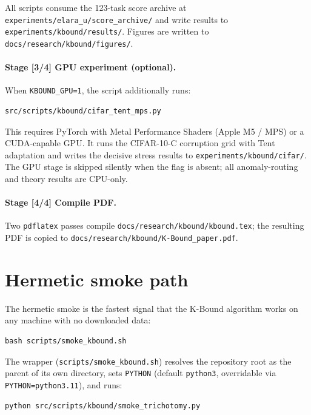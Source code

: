 All scripts consume the 123-task score archive at
\texttt{experiments/elara\_u/score\_archive/} and write results to
\texttt{experiments/kbound/results/}.  Figures are written to
\texttt{docs/research/kbound/figures/}.

\paragraph{Stage [3/4] GPU experiment (optional).}
When \texttt{KBOUND\_GPU=1}, the script additionally runs:

\begin{verbatim}
src/scripts/kbound/cifar_tent_mps.py
\end{verbatim}

This requires PyTorch with Metal Performance Shaders (Apple M5 / MPS) or a
CUDA-capable GPU.  It runs the CIFAR-10-C corruption grid with Tent adaptation
and writes the decisive stress results to \texttt{experiments/kbound/cifar/}.
The GPU stage is skipped silently when the flag is absent; all anomaly-routing
and theory results are CPU-only.

\paragraph{Stage [4/4] Compile PDF.}
Two \texttt{pdflatex} passes compile
\texttt{docs/research/kbound/kbound.tex}; the resulting PDF is copied to
\texttt{docs/research/kbound/K-Bound\_paper.pdf}.

\section{Hermetic smoke path}
\label{sec:app-repro-smoke}

The hermetic smoke is the fastest signal that the K-Bound algorithm works on
any machine with no downloaded data:

\begin{verbatim}
bash scripts/smoke_kbound.sh
\end{verbatim}

The wrapper (\texttt{scripts/smoke\_kbound.sh}) resolves the repository root as
the parent of its own directory, sets \texttt{PYTHON} (default
\texttt{python3}, overridable via \texttt{PYTHON=python3.11}), and runs:

\begin{verbatim}
python src/scripts/kbound/smoke_trichotomy.py
\end{verbatim}

